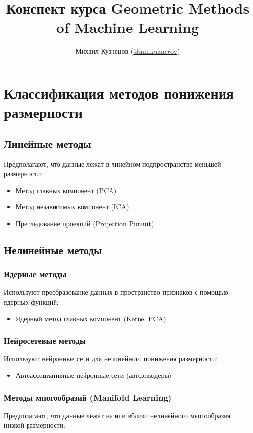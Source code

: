 \documentclass[a4paper,12pt]{article}
\title{Конспект курса Geometric Methods of Machine Learning}
\author{Михаил Кузнецов (\href{https://github.com/mmkuznecov}{@mmkuznecov})}
\date{}
\begin{document}
\maketitle
\tableofcontents


\section{Классификация методов понижения размерности}

\subsection{Линейные методы}
Предполагают, что данные лежат в линейном подпространстве меньшей размерности:
\begin{itemize}
    \item Метод главных компонент (PCA)
    \item Метод независимых компонент (ICA)
    \item Преследование проекций (Projection Pursuit)
\end{itemize}

\subsection{Нелинейные методы}

\subsubsection{Ядерные методы}
Используют преобразование данных в пространство признаков с помощью ядерных функций:
\begin{itemize}
    \item Ядерный метод главных компонент (Kernel PCA)
\end{itemize}

\subsubsection{Нейросетевые методы}
Используют нейронные сети для нелинейного понижения размерности:
\begin{itemize}
    \item Автоассоциативные нейронные сети (автоэнкодеры)
\end{itemize}

\subsubsection{Методы многообразий (Manifold Learning)}
Предполагают, что данные лежат на или вблизи нелинейного многообразия низкой размерности:
\end{document}
